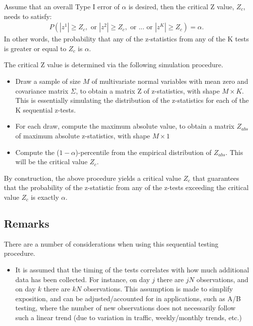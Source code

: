 \documentclass[final,3p,times]{elsarticle}
\begin{document}
Assume that an overall Type I error of $\alpha$ is desired, then the critical Z value, $Z_c$, needs to satisfy:
\begin{align*}
P(|z^1| \geq Z_c, \mbox{ or } |z^2| \geq Z_c, \mbox{ or } ... \mbox{ or }|z^K| \geq Z_c) = \alpha.
\end{align*}
In other words, the probability that any of the z-statistics from any of the K tests is greater or equal to $Z_c$ is $\alpha$.

The critical Z value is determined via the following simulation procedure.
\begin{itemize}
\item Draw a sample of size $M$ of multivariate normal variables with mean zero and covariance matrix $\Sigma$, to obtain a matrix Z of z-statistics, with shape $M\times K$. This is essentially simulating the distribution of the z-statistics for each of the K sequential z-tests.
\item For each draw, compute the maximum absolute value, to obtain a matrix $Z_{abs}$ of maximum absolute z-statistics, with shape  $M\times 1$
\item Compute the ($1-\alpha$)-percentile from the empirical distribution of $Z_{abs}$. This will be the critical value $Z_c$.
\end{itemize}

By construction, the above procedure yields a critical value $Z_c$ that guarantees that the probability of the z-statistic from any of the z-tests exceeding the critical value $Z_c$ is exactly $\alpha$.

\subsection{Remarks}
There are a number of considerations when using this sequential testing procedure.

\begin{itemize}
\item It is assumed that the timing of the tests correlates with how much additional data has been collected. For instance, on day $j$ there are $jN$ observations, and on day $k$ there are $kN$ observations. This assumption is made to simplify exposition, and can be adjusted/accounted for in applications, such as A/B testing, where the number of new observations does not necessarily follow such a linear trend (due to variation in traffic, weekly/monthly trends, etc.)
\end{itemize}

\end{document}
